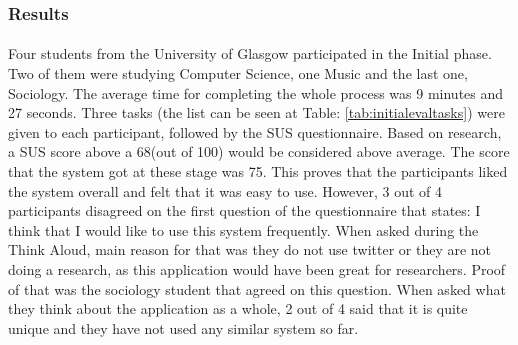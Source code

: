 \documentclass{l4proj}
\begin{document}
\subsubsection{Results}
\paragraph{}
Four students from the University of Glasgow participated in the Initial phase. Two of them were studying Computer Science, one Music and the last one, Sociology. The average time for completing the whole process was 9 minutes and 27 seconds. Three tasks (the list can be seen at Table: \ref{tab:initialevaltasks}) were given to each participant, followed by the SUS questionnaire. Based on research, a SUS score above a 68(out of 100) would be considered above average. The score that the system got at these stage was 75. This proves that the participants liked the system overall and felt that it was easy to use. However, 3 out of 4 participants disagreed on the first question of the questionnaire that states: I think that I would like to use this system frequently. When asked during the Think Aloud, main reason for that was they do not use twitter or they are not doing a research, as this application would have been great for researchers. Proof of that was the sociology student that agreed on this question. When asked what they think about the application as a whole, 2 out of 4 said that it is quite unique and they have not used any similar system so far.
\end{document}
